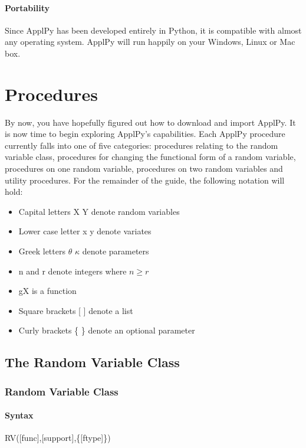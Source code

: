 \documentclass[11pt,epsfig,psfig,doublespace,singlespace]{article}
\begin{document}
\paragraph{Portability} Since ApplPy has been developed entirely in Python, it is compatible with almost any operating system. ApplPy will run happily on your Windows, Linux or Mac box.
\section{Procedures}
By now, you have hopefully figured out how to download and import ApplPy. It is now time to begin exploring ApplPy's capabilities. Each ApplPy procedure currently falls into one of five categories: procedures relating to the random variable class, procedures for changing the functional form of a random variable, procedures on one random variable, procedures on two random variables and utility procedures. For the remainder of the guide, the following notation will hold:
\begin{itemize}
\item Capital letters X Y denote random variables
\item Lower case letter x y denote variates
\item Greek letters $\theta$ $\kappa$ denote parameters
\item n and r denote integers where $n \geq r$
\item gX is a function
\item Square brackets [ ] denote a list
\item Curly brackets \{ \} denote an optional parameter
\end{itemize}
\subsection{The Random Variable Class}
\subsubsection{Random Variable Class}
\paragraph{Syntax} RV([func],[support],\{[ftype]\})
\end{document}
